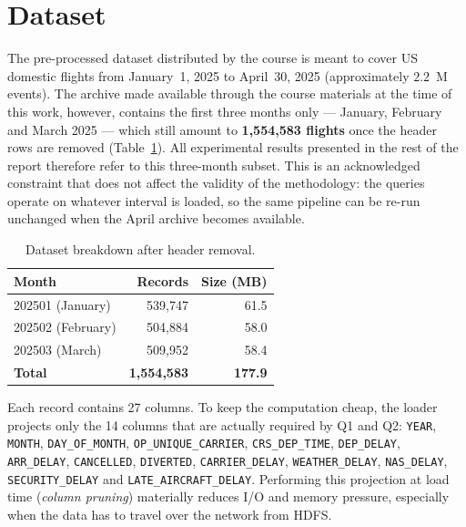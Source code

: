 \documentclass[conference]{IEEEtran}
\begin{document}
\section{Dataset}\label{sec:dataset}

The pre-processed dataset distributed by the course is meant to
cover US domestic flights from January~1, 2025 to April~30, 2025
(approximately $2.2$~M events). The archive made available
through the course materials at the time of this work, however,
contains the first three months only --- January, February and
March 2025 --- which still amount to \textbf{1{,}554{,}583
flights} once the header rows are removed
(Table~\ref{tab:dataset-sizes}). All experimental results
presented in the rest of the report therefore refer to this
three-month subset. This is an acknowledged constraint that
does not affect the validity of the methodology: the queries
operate on whatever interval is loaded, so the same pipeline can
be re-run unchanged when the April archive becomes available.

\begin{table}[h]
\centering
\caption{Dataset breakdown after header removal.}
\label{tab:dataset-sizes}
\begin{tabular}{lrr}
\toprule
\textbf{Month} & \textbf{Records} & \textbf{Size (MB)}\\
\midrule
202501 (January)  & 539{,}747 & 61.5\\
202502 (February) & 504{,}884 & 58.0\\
202503 (March)    & 509{,}952 & 58.4\\
\midrule
\textbf{Total}    & \textbf{1{,}554{,}583} & \textbf{177.9}\\
\bottomrule
\end{tabular}
\end{table}

Each record contains 27 columns. To keep the computation cheap,
the loader projects only the 14 columns that are actually required
by Q1 and Q2: \texttt{YEAR}, \texttt{MONTH},
\texttt{DAY\_OF\_MONTH}, \texttt{OP\_UNIQUE\_CARRIER},
\texttt{CRS\_DEP\_TIME}, \texttt{DEP\_DELAY},
\texttt{ARR\_DELAY}, \texttt{CANCELLED}, \texttt{DIVERTED},
\texttt{CARRIER\_DELAY}, \texttt{WEATHER\_DELAY},
\texttt{NAS\_DELAY}, \texttt{SECURITY\_DELAY} and
\texttt{LATE\_AIRCRAFT\_DELAY}. Performing this projection at
load time (\emph{column pruning}) materially reduces I/O and
memory pressure, especially when the data has to travel over the
network from HDFS.
\end{document}

